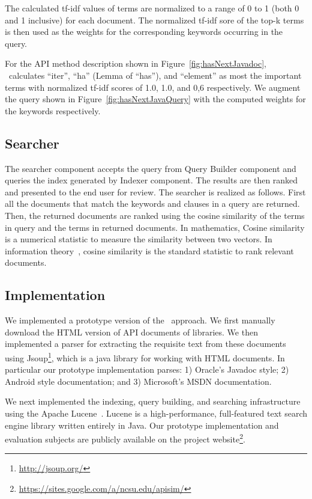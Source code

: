 The calculated tf-idf values of terms are normalized to a range of 0 to 1 (both 0 and 1 inclusive) for each document.
The normalized tf-idf sore of the top-k terms is then used as the weights for the corresponding  keywords occurring in the query.

For the API method description  shown in Figure~\ref{fig:hasNextJavadoc}, \tool\ calculates ``iter'', ``ha'' (Lemma of ``has''), and ``element'' as most the important terms with normalized tf-idf scores of 1.0, 1.0, and 0,6 respectively. We augment the query shown in Figure~\ref{fig:hasNextJavaQuery} with the computed weights for the keywords respectively.

\subsection{Searcher}
\label{sub:approach_searcher}

The searcher component accepts the query from Query Builder component and queries the index generated by Indexer component.
The results are then ranked and presented to the end user for review.
The searcher is realized as follows. 
First all the documents that match the keywords and clauses in a query are returned.
Then, the returned documents are ranked using the cosine similarity\cite{singhal2001modern} of the terms in query and the terms in returned documents. In mathematics, Cosine similarity is a numerical statistic to measure the similarity between two vectors. 
In information theory~\cite{manning2008introduction}, cosine similarity is the standard statistic to rank relevant documents.




    


\subsection{Implementation}
\label{sub:Approach_implementation}

We implemented a prototype version of the \tool\ approach.
We first manually download the HTML version of API documents of libraries. 
We then implemented a parser for extracting the requisite text from these documents using 
Jsoup\footnote{\url{http://jsoup.org/}}, which is a java library for working with HTML documents.
In particular our prototype implementation parses: 
1) Oracle's Javadoc style;
2) Android style documentation; and
3) Microsoft's  MSDN documentation.

We next implemented the indexing, query building, and searching infrastructure using the Apache Lucene~\cite{lucene}.
Lucene is a high-performance, full-featured text search engine library written entirely in Java.
Our prototype implementation and evaluation subjects are publicly available on the project website\footnote{\url{https://sites.google.com/a/ncsu.edu/apisim/}}. 
